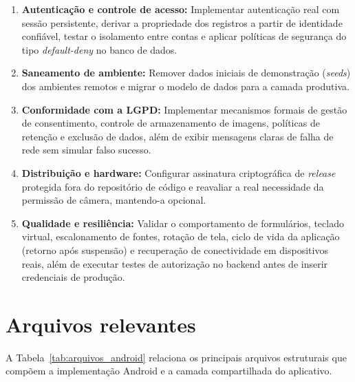 \documentclass[12pt,a4paper]{article}
\begin{document}
\begin{enumerate}[leftmargin=*]
  \item \textbf{Autenticação e controle de acesso:} Implementar autenticação real com sessão persistente, derivar a propriedade dos registros a partir de identidade confiável, testar o isolamento entre contas e aplicar políticas de segurança do tipo \textit{default-deny} no banco de dados.
  \item \textbf{Saneamento de ambiente:} Remover dados iniciais de demonstração (\textit{seeds}) dos ambientes remotos e migrar o modelo de dados para a camada produtiva.
  \item \textbf{Conformidade com a LGPD:} Implementar mecanismos formais de gestão de consentimento, controle de armazenamento de imagens, políticas de retenção e exclusão de dados, além de exibir mensagens claras de falha de rede sem simular falso sucesso.
  \item \textbf{Distribuição e hardware:} Configurar assinatura criptográfica de \textit{release} protegida fora do repositório de código e reavaliar a real necessidade da permissão de câmera, mantendo-a opcional.
  \item \textbf{Qualidade e resiliência:} Validar o comportamento de formulários, teclado virtual, escalonamento de fontes, rotação de tela, ciclo de vida da aplicação (retorno após suspensão) e recuperação de conectividade em dispositivos reais, além de executar testes de autorização no backend antes de inserir credenciais de produção.
\end{enumerate}

\section{Arquivos relevantes}
A Tabela~\ref{tab:arquivos_android} relaciona os principais arquivos estruturais que compõem a implementação Android e a camada compartilhada do aplicativo.
\end{document}
